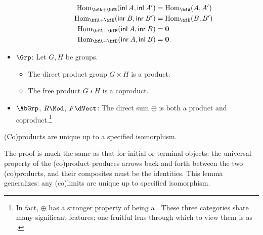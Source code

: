 \documentclass[a5paper]{article}
\begin{document}
\begin{example}
\begin{itemize}
\begin{itemize}
\begin{align*}
            \Hom_{\bfA+\bfB}(\apply{\inl}{A}, \apply{\inl}{A'}) &= \Hom_{\bfA}(A,A') \\
            \Hom_{\bfA+\bfB}(\apply{\inr}{B}, \apply{\inr}{B'}) &= \Hom_{\bfB}(B,B') \\
            \Hom_{\bfA+\bfB}(\apply{\inl}{A}, \apply{\inr}{B}) &= \emptytype \\
            \Hom_{\bfA+\bfB}(\apply{\inr}{A}, \apply{\inl}{B}) &= \emptytype.
          \end{align*}
      \end{itemize}
    \item $\Grp$: Let $G,H$ be groups.
      \begin{itemize}\renewcommand{\labelitemi}{$\circ $}
        \itemsep-0.2em
        \item \vspace{-0.6em} The direct product group $G\times H$ is a product.
        \item The free product $G∗H$ is a coproduct.
      \end{itemize}
    \item $\AbGrp$, $R\Mod$, $F\dVect$: The direct sum $⊕$ is both a product and
      coproduct.\footnote{In fact, $⊕$ has a stronger property of being a
      . These three categories share many significant
      features; one fruitful lens through which to view them is as
      .} 
  \end{itemize}
\end{example}

\begin{lemma}
	(Co)products are unique up to a specified isomorphism.
\end{lemma}

The proof is much the same as that for initial or terminal objects: the
universal property of the (co)product produces arrows back and forth between the
two (co)products, and their composites must be the identities. This lemma
generalizes: any (co)limits are unique up to specified isomorphism.
\end{document}
